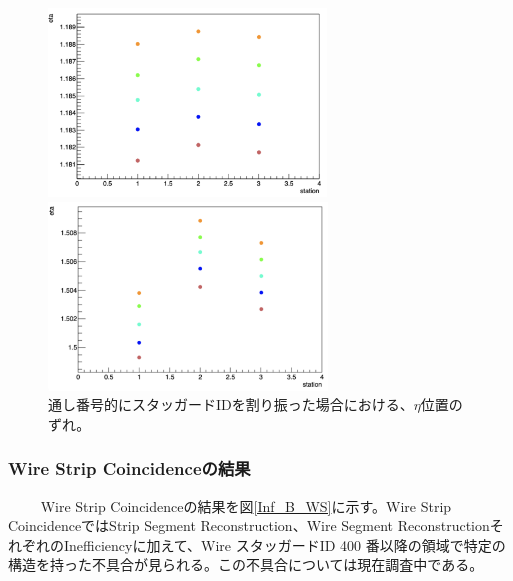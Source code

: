 \begin{figure}
\begin{minipage}[b]{.5\linewidth}
\centering
\includegraphics[height=5cm]{fig/Test/Stag100-105.png}
\end{minipage}%
\begin{minipage}[b]{.5\linewidth}
\centering
\includegraphics[height=5cm]{fig/Test/Stag300-305.png}
\end{minipage}%
\caption[Wireでのスタッガードチャンネルのずれ]{通し番号的にスタッガードIDを割り振った場合における、$\eta$位置のずれ。}
\label{Stag300}
\end{figure}

\subsubsection*{Wire Strip Coincidenceの結果}　　
Wire Strip Coincidenceの結果を図\ref{Inf_B_WS}に示す。Wire Strip CoincidenceではStrip Segment Reconstruction、Wire Segment ReconstructionそれぞれのInefficiencyに加えて、Wire スタッガードID 400 番以降の領域で特定の構造を持った不具合が見られる。この不具合については現在調査中である。

